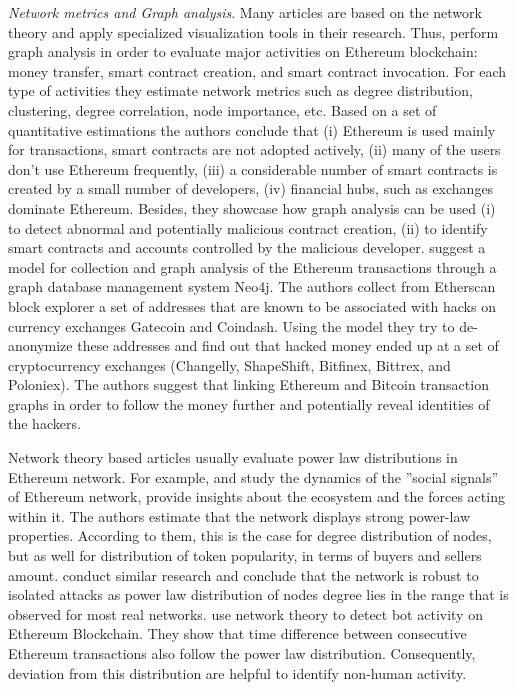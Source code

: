 \textit{Network metrics and Graph analysis}. Many articles are based on the network theory and apply specialized visualization tools in their research.
Thus, \cite{chen2018understanding} perform graph analysis in order to evaluate major activities on Ethereum blockchain: money transfer, smart contract creation, and smart contract invocation. 
For each type of activities they estimate network metrics such as degree distribution, clustering, degree correlation, node importance, etc. 
Based on a set of quantitative estimations the authors conclude that (i) Ethereum is used mainly for transactions, smart contracts are not adopted actively, (ii) many of the users don't use Ethereum frequently, (iii) a considerable number of smart contracts is created by a small number of developers, (iv) financial hubs, such as exchanges dominate Ethereum.
Besides, they showcase how graph analysis can be used (i) to detect abnormal and potentially malicious contract creation, (ii) to identify smart contracts and accounts controlled by the malicious developer.
\cite{chan2017Ethereum} suggest a model for collection and graph analysis of the Ethereum transactions through a graph database management system Neo4j. 
The authors collect from Etherscan block explorer a set of addresses that are known to be associated with hacks on currency exchanges Gatecoin and Coindash. 
Using the model they try to de-anonymize these addresses and find out that hacked money ended up at a set of cryptocurrency exchanges (Changelly, ShapeShift, Bitfinex, Bittrex, and Poloniex). 
The authors suggest that linking Ethereum and Bitcoin transaction graphs in order to follow the money further and potentially reveal identities of the hackers.

Network theory based articles usually evaluate power law distributions in Ethereum network.
For example, \cite{somin2018social} and \cite{somin2018network} study the dynamics of the ”social signals” of Ethereum network, provide insights about the ecosystem and the forces acting within it.
The authors estimate that the network displays strong power-law properties.
According to them, this is the case for degree distribution of nodes, but as well for distribution of token popularity, in terms of buyers and sellers amount.
\cite{anoaica2018quantitative} conduct similar research and conclude that the network is robust to isolated attacks as power law distribution of nodes degree lies in the range that is observed for most real networks.
\cite{zwang2018detecting} use network theory to detect bot activity on Ethereum Blockchain. 
They show that time difference between consecutive Ethereum transactions also follow the power law distribution.
Consequently, deviation from this distribution are helpful to identify non-human activity. 
 

